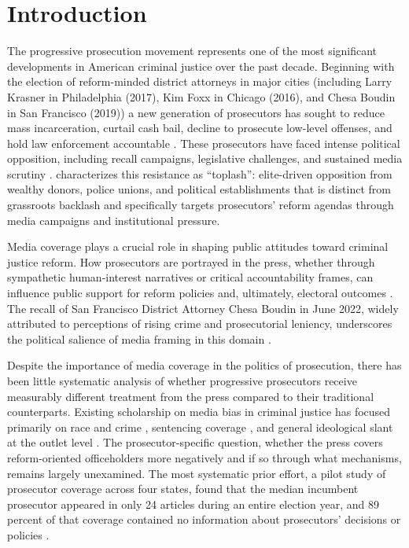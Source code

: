 \documentclass[12pt, letterpaper]{article}
\begin{document}
\newpage
\setcounter{page}{1}

\section{Introduction}

The progressive prosecution movement represents one of the most significant developments in American criminal justice over the past decade. Beginning with the election of reform-minded district attorneys in major cities (including Larry Krasner in Philadelphia (2017), Kim Foxx in Chicago (2016), and Chesa Boudin in San Francisco (2019)) a new generation of prosecutors has sought to reduce mass incarceration, curtail cash bail, decline to prosecute low-level offenses, and hold law enforcement accountable \citep{bellin2019,sklansky2017}. These prosecutors have faced intense political opposition, including recall campaigns, legislative challenges, and sustained media scrutiny \citep{bazelon2019}. \citet{goldstein2024} characterizes this resistance as ``toplash'': elite-driven opposition from wealthy donors, police unions, and political establishments that is distinct from grassroots backlash and specifically targets prosecutors' reform agendas through media campaigns and institutional pressure.

Media coverage plays a crucial role in shaping public attitudes toward criminal justice reform. How prosecutors are portrayed in the press, whether through sympathetic human-interest narratives or critical accountability frames, can influence public support for reform policies and, ultimately, electoral outcomes \citep{iyengar1991,entman1993}. The recall of San Francisco District Attorney Chesa Boudin in June 2022, widely attributed to perceptions of rising crime and prosecutorial leniency, underscores the political salience of media framing in this domain \citep{yogev2026holding}.

Despite the importance of media coverage in the politics of prosecution, there has been little systematic analysis of whether progressive prosecutors receive measurably different treatment from the press compared to their traditional counterparts. Existing scholarship on media bias in criminal justice has focused primarily on race and crime \citep{dixon2000}, sentencing coverage \citep{surette2015}, and general ideological slant at the outlet level \citep{groseclose2005}. The prosecutor-specific question, whether the press covers reform-oriented officeholders more negatively and if so through what mechanisms, remains largely unexamined. The most systematic prior effort, a pilot study of prosecutor coverage across four states, found that the median incumbent prosecutor appeared in only 24 articles during an entire election year, and 89 percent of that coverage contained no information about prosecutors' decisions or policies \citep{hessick2023}.
\end{document}
